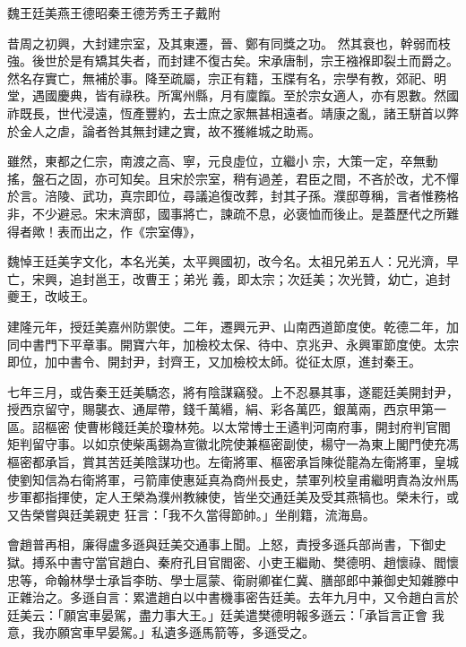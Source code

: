 
\begin{pinyinscope}

 魏王廷美燕王德昭秦王德芳秀王子戴附



 昔周之初興，大封建宗室，及其東遷，晉、鄭有同獎之功。
 然其衰也，幹弱而枝強。後世於是有矯其失者，而封建不復古矣。宋承唐制，宗王襁褓即裂土而爵之。然名存實亡，無補於事。降至疏屬，宗正有籍，玉牒有名，宗學有教，郊祀、明堂，遇國慶典，皆有祿秩。所寓州縣，月有廩餼。至於宗女適人，亦有恩數。然國祚既長，世代浸遠，恆產豐約，去士庶之家無甚相遠者。靖康之亂，諸王駢首以弊於金人之虐，論者咎其無封建之實，故不獲維城之助焉。



 雖然，東都之仁宗，南渡之高、寧，元良虛位，立繼小
 宗，大策一定，卒無動搖，盤石之固，亦可知矣。且宋於宗室，稍有過差，君臣之間，不吝於改，尤不憚於言。涪陵、武功，真宗即位，尋議追復改葬，封其子孫。濮邸尊稱，言者惟務格非，不少避忌。宋末濟邸，國事將亡，諫疏不息，必褒恤而後止。是蓋歷代之所難得者歟！表而出之，作《宗室傳》，



 魏悼王廷美字文化，本名光美，太平興國初，改今名。太祖兄弟五人：兄光濟，早亡，宋興，追封邕王，改曹王；弟光
 義，即太宗；次廷美；次光贊，幼亡，追封夔王，改岐王。



 建隆元年，授廷美嘉州防禦使。二年，遷興元尹、山南西道節度使。乾德二年，加同中書門下平章事。開寶六年，加檢校太保、待中、京兆尹、永興軍節度使。太宗即位，加中書令、開封尹，封齊王，又加檢校太師。從征太原，進封秦王。



 七年三月，或告秦王廷美驕恣，將有陰謀竊發。上不忍暴其事，遂罷廷美開封尹，授西京留守，賜襲衣、通犀帶，錢千萬緡，絹、彩各萬匹，銀萬兩，西京甲第一區。詔樞密
 使曹彬餞廷美於瓊林苑。以太常博士王遹判河南府事，開封府判官閻矩判留守事。以如京使柴禹錫為宣徽北院使兼樞密副使，楊守一為東上閣門使充馮樞密都承旨，賞其苦廷美陰謀功也。左衛將軍、樞密承旨陳從龍為左衛將軍，皇城使劉知信為右衛將軍，弓箭庫使惠延真為商州長史，禁軍列校皇甫繼明責為汝州馬步軍都指揮使，定人王榮為濮州教練使，皆坐交通廷美及受其燕犒也。榮未行，或又告榮嘗與廷美親吏
 狂言：「我不久當得節帥。」坐削籍，流海島。



 會趙普再相，廉得盧多遜與廷美交通事上聞。上怒，責授多遜兵部尚書，下御史獄。搏系中書守當官趙白、秦府孔目官閻密、小吏王繼勛、樊德明、趙懷祿、閻懷忠等，命翰林學士承旨李昉、學士扈蒙、衛尉卿崔仁冀、膳部郎中兼御史知雜滕中正雜治之。多遜自言：累遣趙白以中書機事密告廷美。去年九月中，又令趙白言於廷美云：「願宮車晏駕，盡力事大王。」廷美遣樊德明報多遜云：「承旨言正會
 我意，我亦願宮車早晏駕。」私遺多遜馬箭等，多遜受之。




\end{pinyinscope}
